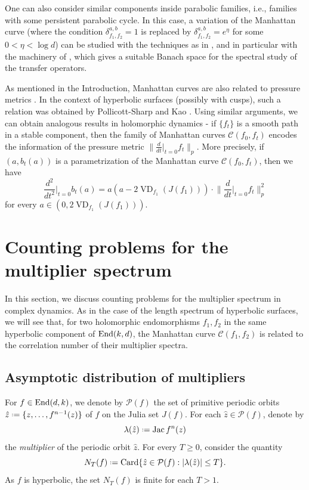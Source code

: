 \documentclass[11pt]{amsart}
\theoremstyle{plain}
\theoremstyle{definition}
\theoremstyle{remark}
\newcommand*{\defeq}{\mathrel{\vcenter{\baselineskip0.5ex \lineskiplimit0pt
			\hbox{\scriptsize.}\hbox{\scriptsize.}}}%
	=}
\DeclareMathOperator{\VD}{VD}
\DeclareMathOperator{\Jac}{Jac}
\begin{document}
One can also consider similar components
inside parabolic families, i.e., families with some persistent parabolic cycle.
In this case,
a variation of the Manhattan curve (where 
the condition $\delta^{a,b}_{f_1, f_2}=1$
is replaced by $\delta^{a,b}_{f_1, f_2}=e^\eta$ for some $0<\eta<\log d$)
can be studied with the techniques as in \cite{BH24}, and in particular with the machinery of \cite{BD23eq1,BD24eq2}, which gives a suitable Banach space for the spectral study of the transfer operators.

As mentioned in the Introduction, Manhattan curves are
also related to pressure metrics
\cite{McMullen08,Ivrii14,HeNie23,BH24,BH25,HLP23,HLP25}.
In the context of hyperbolic surfaces (possibly with cusps), such a relation was obtained by Pollicott-Sharp \cite[Section 4]{PS16} and Kao \cite[Theorem D]{Kao20}. 
Using similar arguments, we can
obtain analogous results in holomorphic dynamics - if $\{f_t\}$ is a smooth path in a stable component, then the family of Manhattan curves $\mathcal{C}(f_0,f_t)$ encodes the information of the 
pressure metric $\|\frac{d}{dt}|_{t=0}f_t\|_p$. More precisely, if $(a,b_t(a))$ is a parametrization of
the Manhattan curve $\mathcal{C}(f_0,f_t)$, then we have $$\frac{d^2}{dt^2}\bigg|_{t=0}b_t(a) = a(a-2\VD_{f_1}(J(f_1))) \cdot \Big\|\frac{d}{dt}\big|_{t=0}f_t\Big\|_p^2$$
for every $a \in (0,2\VD_{f_1}(J(f_1)))$.


\section{Counting problems for the multiplier spectrum}
In this section, we discuss counting problems
for the multiplier spectrum
in complex dynamics. As in the case
of the length spectrum
of hyperbolic surfaces, we will see that,
for two holomorphic endomorphisms $f_1,f_2$ in the same hyperbolic component of ${\rm End} (k,d)$, 
the Manhattan curve $\mathcal{C}(f_1,f_2)$ is related to the correlation number of their 
multiplier spectra.

\subsection{Asymptotic distribution of multipliers}
For $f \in {\rm End}(d,k)$, we denote by $\mathcal{P}(f)$ the set of primitive periodic orbits $\hat{z} \defeq \{z,\ldots,f^{n-1}(z)\}$ of $f$ on the Julia set $J(f)$. For each $\hat{z} \in \mathcal{P}(f)$, denote by 
$$\lambda(\hat{z}) \defeq  \Jac f^n(z)$$
the {\it multiplier} of the periodic orbit $\hat{z}$.
For every $T\geq 0$, 
consider the quantity
$$N_T(f) \defeq {\rm Card}\{\hat{z} \in \mathcal{P}(f) : |\lambda(\hat{z})| \le T\}.$$
As 
$f$ is hyperbolic, the set $N_T(f)$ is finite for each $T > 1$.
\end{document}
